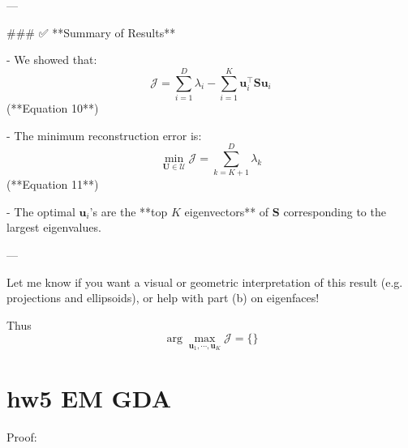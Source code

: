 \documentclass[lang=cn,11pt]{elegantbook}
\begin{document}
---

### ✅ **Summary of Results**

- We showed that:
  \[
  \mathcal{J} = \sum_{i=1}^D \lambda_i - \sum_{i=1}^K \mathbf{u}_i^\top \mathbf{S} \mathbf{u}_i
  \]
  (**Equation 10**)

- The minimum reconstruction error is:
  \[
  \min_{\mathbf{U} \in \mathcal{U}} \mathcal{J} = \sum_{k=K+1}^D \lambda_k
  \]
  (**Equation 11**)

- The optimal \(\mathbf{u}_i\)'s are the **top \(K\) eigenvectors** of \(\mathbf{S}\) corresponding to the largest eigenvalues.

---

Let me know if you want a visual or geometric interpretation of this result (e.g. projections and ellipsoids), or help with part (b) on eigenfaces!

Thus \[
\arg \max_{\mathbf{u}_1,\cdots ,\mathbf{u}_K} \mathcal{J} = \{ \}
\]




\section{hw5 EM GDA}

Proof:
\end{document}
